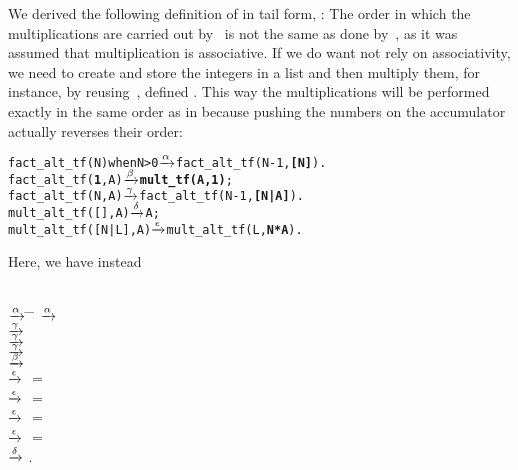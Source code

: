 \noindent We derived the following definition of 
in tail form, :
 The order in which the multiplications are
carried out by~ is not the same as done
by~, as it was assumed that multiplication is
associative. If we do want not rely on associativity, we need to
create and store the integers in a list and then multiply them, for
instance, by reusing~, defined
. This way the multiplications will be
performed exactly in the same order as in  because
pushing the numbers on the accumulator actually reverses their order:
\begin{alltt}
fact_alt_tf(N) when N > 0 \(\smashedrightarrow{\alpha}\) fact_alt_tf(N-1,\textbf{[N]}).
fact_alt_tf(\textbf{1},A)          \(\smashedrightarrow{\beta}\) \textbf{mult_tf(A,1)};
fact_alt_tf(N,A)          \(\smashedrightarrow{\gamma}\) fact_alt_tf(N-1,\textbf{[N|A]}).
mult_alt_tf(   [],A)      \(\smashedrightarrow{\delta}\) A;
mult_alt_tf([N|L],A)      \(\smashedrightarrow{\epsilon}\) mult_alt_tf(L,\textbf{N*A}).\hfil% \emph{Changed}
\end{alltt}
Here, we have instead
\begin{tabbing}
\\
 \= \(\xrightarrow{\smash{\alpha}}\) \=  \=\kill
\> \(\xrightarrow{\smash{\alpha}}\) \> \\
\> \(\xrightarrow{\smash{\gamma}}\) \> \\
\> \(\xrightarrow{\smash{\gamma}}\) \> \\
\> \(\xrightarrow{\smash{\gamma}}\) \> \\
\> \(\xrightarrow{\smash{\beta}}\) \> \\
\> \(\xrightarrow{\smash{\epsilon}}\) \> 
\> \(=\) \\
\> \(\xrightarrow{\smash{\epsilon}}\) \> 
\> \(=\) \\
\> \(\xrightarrow{\smash{\epsilon}}\) \> 
\> \(=\) \\
\> \(\xrightarrow{\smash{\epsilon}}\) \> 
\> \(=\) \\
\> \(\xrightarrow{\smash{\delta}}\) \> \textrm{.}
\end{tabbing}
